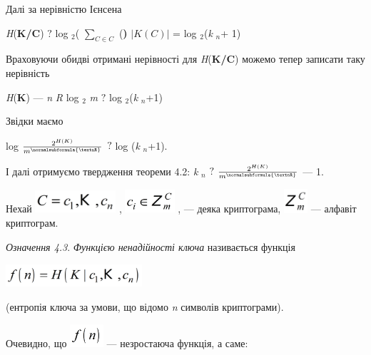 Далі за нерівністю Ієнсена

{\centering
\textit{H}(\textbf{K}\textbf{/}\textbf{C})   $?$ log $_2$(
$\underset{C\in C}{\sum }$ \textitP(\textitC\textbf{) } $|K(C)|$ = 
log ${}_2$(\textit{k} $_n$+ 1) $ $
\par}

Враховуючи обидві отримані нерівності для 
\textit{H}(\textbf{K}\textbf{/}\textbf{C}) можемо тепер записати таку
нерівність 

{\centering
\textit{H}(\textbf{K}) --- \textit{n}\textit{ }\textit{R} log $_2$
\textit{m}   $?$  log ${}_2$(\textit{k} $_n$+1)
\par}

Звідки  маємо

{\centering
log  $\frac{2^{H(K)}}{m^{\normalsubformula{\textnR}}}$   $?$  log
(\textit{k} $_n$+1).
\par}

І  далі отримуємо твердження теореми 4.2:  \textit{k} $_n$   $?$  
$\frac{2^{H(K)}}{m^{\normalsubformula{\textnR}}}$  --- 1. 

Нехай 
\includegraphics[width=1.1764in,height=0.3327in]{crypt-img/crypt-img38.png} ,  
\includegraphics[width=0.7201in,height=0.3472in]{crypt-img/crypt-img39.png} , ---
деяка криптограма, 
\includegraphics[width=0.3465in,height=0.3465in]{crypt-img/crypt-img40.png}  ---
алфавіт криптограм.

\textit{Означення 4.3}. \textit{Функцією ненадійності ключа} називається 
функція 

{\centering 
\includegraphics[width=1.9882in,height=0.3346in]{crypt-img/crypt-img41.png}
\par}

(ентропія ключа за умови, що відомо \textit{n }символів криптограми).

Очевидно, що 
\includegraphics[width=0.4874in,height=0.3354in]{crypt-img/crypt-img42.png}  ---
незростаюча функція, а саме:

